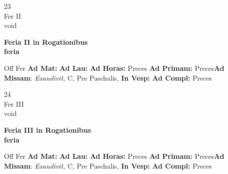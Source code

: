 \documentclass[10pt, openany]{book}
\begin{document}
    \begin{center}
        \begin{minipage}{3.5in}
            \vspace{2em}
            \begin{minipage}{0.5in}
                {\Huge 23} \\
                {\normalsize Fer II} \\
                {\normalsize void}
            \end{minipage}
            \begin{minipage}{3.0in}
                \textbf{ \large Feria II in Rogationibus \\
                \textnormal{\normalsize feria}} \\ 
            \end{minipage}
            \begin{justify}Off Fer
                \textbf{Ad Mat: }
                \textbf{Ad Lau: }
                \textbf{Ad Horas: }Preces
                \textbf{Ad Primam: }Preces\textbf{Ad Missam}: \textit{Exaudivit,} C, Pre Paschalis,  
                \textbf{In Vesp: }
                \textbf{Ad Compl: }Preces
            \end{justify}
        \end{minipage}
    \end{center}

    \begin{center}
        \begin{minipage}{3.5in}
            \vspace{2em}
            \begin{minipage}{0.5in}
                {\Huge 24} \\
                {\normalsize Fer III} \\
                {\normalsize void}
            \end{minipage}
            \begin{minipage}{3.0in}
                \textbf{ \large Feria III in Rogationibus \\
                \textnormal{\normalsize feria}} \\ 
            \end{minipage}
            \begin{justify}Off Fer
                \textbf{Ad Mat: }
                \textbf{Ad Lau: }
                \textbf{Ad Horas: }Preces
                \textbf{Ad Primam: }Preces\textbf{Ad Missam}: \textit{Exaudivit,} C, Pre Paschalis,  
                \textbf{In Vesp: }
                \textbf{Ad Compl: }Preces
            \end{justify}
        \end{minipage}
    \end{center}
\end{document}
